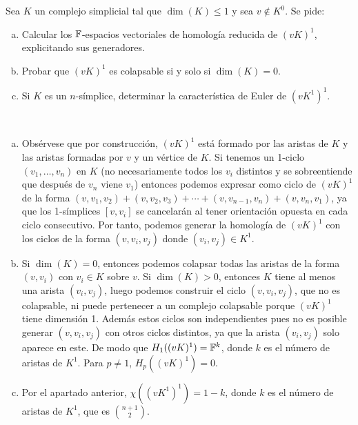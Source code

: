 \documentclass[twoside]{article}
\begin{document}
\newpage

\begin{ejercicio}{3}
Sea $K$ un complejo simplicial tal que $\dim(K)\leq 1$ y sea $v\notin K^0$. Se pide:
\begin{enumerate}[(a)]
\item Calcular los $\mathbb{F}$-espacios vectoriales de homología reducida de $(vK)^1$, explicitando sus generadores. 
\item Probar que $(vK)^1$ es colapsable si y solo si $\dim(K)=0$. 
\item Si $K$ es un $n$-símplice, determinar la característica de Euler de $(vK^1)^1$. 
\end{enumerate}
\end{ejercicio}
\begin{solucion}\
\begin{enumerate}[(a)]
\item Obsérvese que por construcción, $(vK)^1$ está formado por las aristas de $K$ y las aristas formadas por $v$ y un vértice de $K$. Si tenemos un 1-ciclo $(v_1,\dots, v_n)$ en $K$ (no necesariamente todos los $v_i$ distintos y se sobreentiende que después de $v_n$ viene $v_1$) entonces podemos expresar como ciclo de $(vK)^1$ de la forma $(v, v_1,v_2)+(v,v_2,v_3)+\cdots+(v,v_{n-1}, v_n)+(v,v_n,v_1)$, ya que los 1-símplices $[v,v_i]$ se cancelarán al tener orientación opuesta en cada ciclo consecutivo. Por tanto, podemos generar la homología de $(vK)^1$ con los ciclos de la forma $(v,v_i,v_j)$ donde $(v_i,v_j)\in K^1$. 
\item Si $\dim(K)=0$, entonces podemos colapsar todas las aristas de la forma $(v,v_i)$ con $v_i\in K$ sobre $v$. Si $\dim(K)>0$, entonces $K$ tiene al menos una arista $(v_i,v_j)$, luego podemos construir el ciclo $(v,v_i,v_j)$, que no es colapsable, ni puede pertenecer a un complejo colapsable porque $(vK)^1$ tiene dimensión 1. Además estos ciclos son independientes pues no es posible generar $(v, v_i,v_j)$ con otros ciclos distintos, ya que la arista $(v_i,v_j)$ solo aparece en este. De modo que $H_1((vK)^1)=\mathbb{F}^k$, donde $k$ es el número de aristas de $K^1$. Para $p\neq 1$, $H_p((vK)^1)=0$.
\item Por el apartado anterior, $\chi((vK^1)^1)=1-k$, donde $k$ es el número de aristas de $K^1$, que es $\binom{n+1}{2}$. 
\end{enumerate}
\end{solucion}
\end{document}
